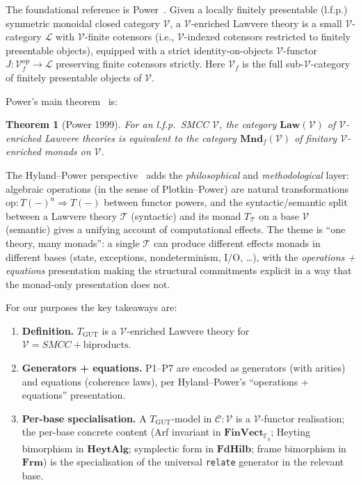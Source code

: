 \documentclass[11pt,a4paper]{article}
\theoremstyle{plain}
\newtheorem{theorem}{Theorem}[section]
\theoremstyle{definition}
\theoremstyle{remark}
\newcommand{\F}{\mathbb{F}}
\newcommand{\cat}[1]{\mathbf{#1}}
\newcommand{\HeytAlg}{\cat{HeytAlg}}
\newcommand{\FdHilb}{\cat{FdHilb}}
\newcommand{\Frm}{\cat{Frm}}
\newcommand{\FinVect}{\cat{FinVect}}
\newcommand{\op}{\mathrm{op}}
\newcommand{\TGUT}{T_{\mathrm{GUT}}}
\newcommand{\smcc}{SMCC}
\begin{document}
The foundational reference is Power~\cite{Pow99}. Given a locally finitely presentable (l.f.p.) symmetric monoidal closed category $\mathcal{V}$, a $\mathcal{V}$-enriched Lawvere theory is a small $\mathcal{V}$-category $\mathcal{L}$ with $\mathcal{V}$-finite cotensors (i.e., $\mathcal{V}$-indexed cotensors restricted to finitely presentable objects), equipped with a strict identity-on-objects $\mathcal{V}$-functor $J : \mathcal{V}_f^{\op} \to \mathcal{L}$ preserving finite cotensors strictly. Here $\mathcal{V}_f$ is the full sub-$\mathcal{V}$-category of finitely presentable objects of $\mathcal{V}$.

Power's main theorem~\cite[Theorem 4.2]{Pow99} is:

\begin{theorem}[Power 1999]\label{thm:power}
For an l.f.p.\ \smcc{} $\mathcal{V}$, the category $\cat{Law}(\mathcal{V})$ of $\mathcal{V}$-enriched Lawvere theories is equivalent to the category $\cat{Mnd}_f(\mathcal{V})$ of finitary $\mathcal{V}$-enriched monads on $\mathcal{V}$.
\end{theorem}

The Hyland--Power perspective~\cite{HP07} adds the \emph{philosophical} and \emph{methodological} layer: algebraic operations (in the sense of Plotkin--Power) are natural transformations $\mathrm{op} : T(-)^n \Rightarrow T(-)$ between functor powers, and the syntactic/semantic split between a Lawvere theory $\mathcal{T}$ (syntactic) and its monad $T_{\mathcal{T}}$ on a base $\mathcal{V}$ (semantic) gives a unifying account of computational effects. The theme is ``one theory, many monads'': a single $\mathcal{T}$ can produce different effects monads in different bases (state, exceptions, nondeterminism, I/O, \dots), with the \emph{operations + equations} presentation making the structural commitments explicit in a way that the monad-only presentation does not.

For our purposes the key takeaways are:

\begin{enumerate}[leftmargin=*]
\item \textbf{Definition.} $\TGUT$ is a $\mathcal{V}$-enriched Lawvere theory for $\mathcal{V} = \smcc + \text{biproducts}$.
\item \textbf{Generators + equations.} P1--P7 are encoded as generators (with arities) and equations (coherence laws), per Hyland--Power's ``operations + equations'' presentation.
\item \textbf{Per-base specialisation.} A $\TGUT$-model in $\mathcal{C}:\mathcal{V}$ is a $\mathcal{V}$-functor realisation; the per-base concrete content (Arf invariant in $\FinVect_{\F_q}$; Heyting bimorphism in $\HeytAlg$; symplectic form in $\FdHilb$; frame bimorphism in $\Frm$) is the specialisation of the universal \texttt{relate} generator in the relevant base.
\end{enumerate}
\end{document}
